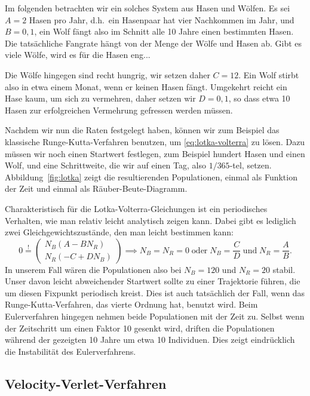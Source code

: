 Im folgenden betrachten wir ein solches System aus Hasen und
Wölfen. Es sei $A=2$ Hasen pro Jahr, d.h.\ ein Hasenpaar hat vier
Nachkommen im Jahr, und $B=0,1$, ein Wolf fängt also im Schnitt alle
10 Jahre einen bestimmten Hasen. Die tatsächliche Fangrate hängt von
der Menge der Wölfe und Hasen ab. Gibt es viele Wölfe, wird es für die
Hasen eng...

Die Wölfe hingegen sind recht hungrig, wir setzen daher $C=12$. Ein
Wolf stirbt also in etwa einem Monat, wenn er keinen Hasen
fängt. Umgekehrt reicht ein Hase kaum, um sich zu vermehren, daher
setzen wir $D=0,1$, so dass etwa 10 Hasen zur erfolgreichen Vermehrung
gefressen werden müssen.

Nachdem wir nun die Raten festgelegt haben, können wir zum Beispiel
das klassische Runge-Kutta-Verfahren benutzen, um
\eqref{eq:lotka-volterra} zu lösen. Dazu müssen wir noch einen
Startwert festlegen, zum Beispiel hundert Hasen und einen Wolf, und
eine Schrittweite, die wir auf einen Tag, also $1/365$-tel,
setzen. Abbildung~\ref{fig:lotka} zeigt die resultierenden
Populationen, einmal als Funktion der Zeit und einmal als
Räuber-Beute-Diagramm.

Charakteristisch für die Lotka-Volterra-Gleichungen ist ein
periodisches Verhalten, wie man relativ leicht analytisch zeigen
kann. Dabei gibt es lediglich zwei Gleichgewichtszustände, den man
leicht bestimmen kann:
\begin{equation}
  0 \stackrel{!}{=}
  \begin{pmatrix}
    N_B (A - B N_R)\\
    N_R (-C + D N_B)
  \end{pmatrix}
  \implies N_B=N_R=0\;
  \text{oder}\;N_B=\frac{C}{D}\;\text{und}\;N_R=\frac{A}{B}.
\end{equation}
In unserem Fall wären die Populationen also bei $N_B=120$ und $N_R=20$
stabil. Unser davon leicht abweichender Startwert sollte zu einer
Trajektorie führen, die um diesen Fixpunkt periodisch kreist. Dies ist
auch tatsächlich der Fall, wenn das Runge-Kutta-Verfahren, das vierte
Ordnung hat, benutzt wird. Beim Eulerverfahren hingegen nehmen beide
Populationen mit der Zeit zu. Selbst wenn der Zeitschritt um einen
Faktor 10 gesenkt wird, driften die Populationen während der gezeigten
10 Jahre um etwa 10 Individuen. Dies zeigt eindrücklich die
Instabilität des Eulerverfahrens.

\subsection{Velocity-Verlet-Verfahren}

